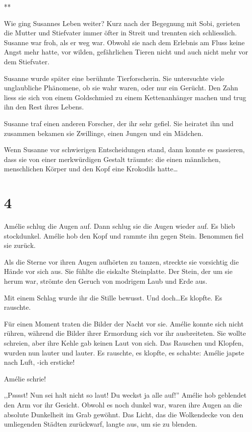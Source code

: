 \documentclass[11pt,titlepage,a5paper]{book}
\newcommand{\sterne}{\par{\centering ***\par}}
\begin{document}
\sterne

Wie ging Susannes Leben weiter? Kurz nach der Begegnung mit Sobi, gerieten die Mutter und Stiefvater immer öfter in Streit und trennten sich schliesslich. Susanne war froh, als er weg war. Obwohl sie nach dem Erlebnis am Fluss keine Angst mehr hatte, vor wilden, gefährlichen Tieren nicht und auch nicht mehr vor dem Stiefvater.

Susanne wurde später eine berühmte Tierforscherin. Sie untersuchte viele unglaubliche Phänomene, ob sie wahr waren, oder nur ein Gerücht. Den Zahn liess sie sich von einem Goldschmied zu einem Kettenanhänger machen und trug ihn den Rest ihres Lebens.

Susanne traf einen anderen Forscher, der ihr sehr gefiel. Sie heiratet ihn und zusammen bekamen sie Zwillinge, einen Jungen und ein Mädchen.

Wenn Susanne vor schwierigen Entscheidungen stand, dann konnte es passieren, dass sie von einer merkwürdigen Gestalt träumte: die einen männlichen, menschlichen Körper und den Kopf eine Krokodils hatte\dots

\section*{4}

Amélie schlug die Augen auf. Dann schlug sie die Augen wieder auf. Es blieb stockdunkel. Amélie hob den Kopf und rammte ihn gegen Stein. Benommen fiel sie zurück. 

Als die Sterne vor ihren Augen aufhörten zu tanzen, streckte sie vorsichtig die Hände vor sich aus. Sie fühlte die eiskalte Steinplatte. Der Stein, der um sie herum war, strömte den Geruch von modrigem Laub und Erde aus.

Mit einem Schlag wurde ihr die Stille bewusst. Und doch\dots Es klopfte. Es rauschte. 

Für einen Moment traten die Bilder der Nacht vor sie. Amélie konnte sich nicht rühren, während die Bilder ihrer Ermordung sich vor ihr ausbreiteten. Sie wollte schreien, aber ihre Kehle gab keinen Laut von sich. Das Rauschen und Klopfen, wurden nun lauter und lauter. Es rauschte, es klopfte, es schabte: Amélie japste nach Luft, -ich ersticke!

Amélie schrie!

,,Psssst! Nun sei halt nicht so laut! Du weckst ja alle auf!'' Amélie hob geblendet den Arm vor ihr Gesicht. Obwohl es noch dunkel war, waren ihre Augen an die absolute Dunkelheit im Grab gewöhnt. Das Licht, das die Wolkendecke von den umliegenden Städten zurückwarf, langte aus, um sie zu blenden.
\end{document}
